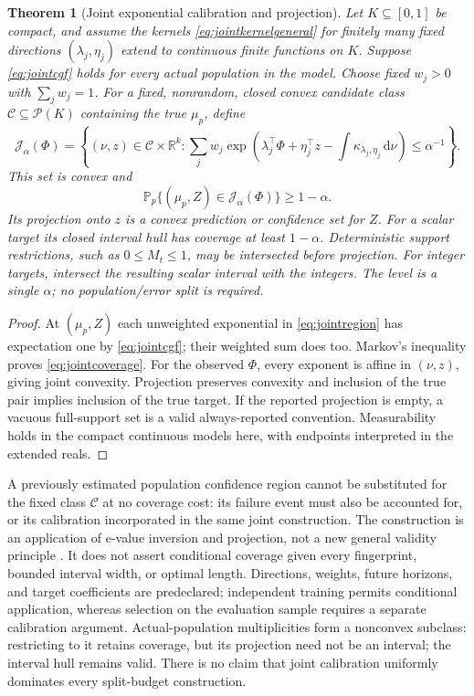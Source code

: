 \documentclass[11pt]{article}
\numberwithin{equation}{section}
\newtheorem{theorem}{Theorem}[section]
\theoremstyle{definition}
\theoremstyle{remark}
\newcommand{\Pp}{\mathbb P}
\newcommand{\R}{\mathbb R}
\newcommand{\Prob}{\mathcal P}
\newcommand{\Ccal}{\mathcal C}
\newcommand{\dd}{\,\mathrm d}
\begin{document}
\begin{theorem}[Joint exponential calibration and projection]\label{thm:jointcalibration}
Let $K\subseteq[0,1]$ be compact, and assume the kernels \eqref{eq:jointkernelgeneral} for finitely many fixed directions $(\lambda_j,\eta_j)$ extend to continuous finite functions on $K$. Suppose \eqref{eq:jointcgf} holds for every actual population in the model. Choose fixed $w_j>0$ with $\sum_jw_j=1$. For a fixed, nonrandom, closed convex candidate class $\Ccal\subseteq\Prob(K)$ containing the true $\mu_p$, define
\begin{equation}\label{eq:jointregion}
 \mathcal J_\alpha(\Phi)=
 \left\{(\nu,z)\in\Ccal\times\R^k:
 \sum_jw_j\exp\left(\lambda_j^\top\Phi+\eta_j^\top z
             -\int\kappa_{\lambda_j,\eta_j}\dd\nu\right)
 \le\alpha^{-1}\right\}.
\end{equation}
This set is convex and
\begin{equation}\label{eq:jointcoverage}
 \Pp_p\{(\mu_p,Z)\in\mathcal J_\alpha(\Phi)\}\ge1-\alpha.
\end{equation}
Its projection onto $z$ is a convex prediction or confidence set for $Z$. For a scalar target its closed interval hull has coverage at least $1-\alpha$. Deterministic support restrictions, such as $0\le M_t\le1$, may be intersected before projection. For integer targets, intersect the resulting scalar interval with the integers. The level is a single $\alpha$; no population/error split is required.
\end{theorem}
\begin{proof}
At $(\mu_p,Z)$ each unweighted exponential in \eqref{eq:jointregion} has expectation one by \eqref{eq:jointcgf}; their weighted sum does too. Markov's inequality proves \eqref{eq:jointcoverage}. For the observed $\Phi$, every exponent is affine in $(\nu,z)$, giving joint convexity. Projection preserves convexity and inclusion of the true pair implies inclusion of the true target. If the reported projection is empty, a vacuous full-support set is a valid always-reported convention. Measurability holds in the compact continuous models here, with endpoints interpreted in the extended reals.
\end{proof}
A previously estimated population confidence region cannot be substituted for the fixed class $\Ccal$ at no coverage cost: its failure event must also be accounted for, or its calibration incorporated in the same joint construction. The construction is an application of e-value inversion and projection, not a new general validity principle \cite{Wasserman2020,Howard2021}. It does not assert conditional coverage given every fingerprint, bounded interval width, or optimal length. Directions, weights, future horizons, and target coefficients are predeclared; independent training permits conditional application, whereas selection on the evaluation sample requires a separate calibration argument. Actual-population multiplicities form a nonconvex subclass: restricting to it retains coverage, but its projection need not be an interval; the interval hull remains valid. There is no claim that joint calibration uniformly dominates every split-budget construction.
\end{document}
